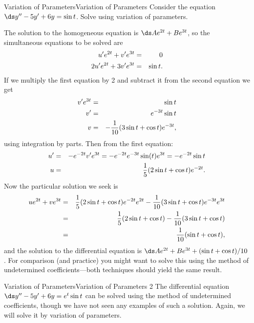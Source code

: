 \begin{example}{Variation of Parameters}{Variation of Parameters}\label{Variation of Parameters}
Consider the equation $\ds y''-5y'+6y=\sin t$. 
Solve using variation of parameters. 
\end{example}

\begin{solution}
The solution to the homogeneous equation is
$\ds Ae^{2t}+Be^{3t}$, so the 
simultaneous equations to be solved are
\begin{eqnarray*}
u'e^{2t}+v'e^{3t}&=&0\cr
2u'e^{2t}+3v'e^{3t}&=&\sin t.
\end{eqnarray*}
If we multiply the first equation by 2 and subtract it from the second
equation we get
\begin{eqnarray*}
v'e^{3t}&=&\sin t\cr
v'&=&e^{-3t}\sin t\cr
v&=&-{1\over 10}(3\sin t+\cos t)e^{-3t},
\end{eqnarray*}
using integration by parts. Then from the first equation:
\begin{eqnarray*}
u'&=&-e^{-2t}v'e^{3t}=-e^{-2t}e^{-3t}\sin(t)e^{3t}=-e^{-2t}\sin
t\cr
u&=&{1\over 5}(2\sin t+\cos t)e^{-2t}.
\end{eqnarray*}
Now the particular solution we seek is
\begin{eqnarray*}
ue^{2t}+ve^{3t}&=&{1\over 5}(2\sin t+\cos t)e^{-2t}e^{2t}
-{1\over 10}(3\sin t+\cos t)e^{-3t}e^{3t}\cr
&=&{1\over 5}(2\sin t+\cos t)-{1\over 10}(3\sin t+\cos t)\cr
&=&{1\over 10}(\sin t+\cos t),
\end{eqnarray*}
and the solution to the differential equation is
$\ds Ae^{2t}+Be^{3t}+(\sin t+\cos t)/10$. For comparison (and
practice) you might want to solve this using the method of
undetermined coefficients---both techniques should yield the same result.
\end{solution}

\begin{example}{Variation of Parameters}{Variation of Parameters 2}\label{Variation of Parameters 2}
 The differential equation $\ds y''-5y'+6y=e^t\sin t$
can be solved using the method of undetermined coefficients, though we
have not seen any examples of such a solution. Again, we will solve it
by variation of parameters.
\end{example}

